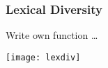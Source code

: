 
\begin{frame}[fragile]\frametitle{Lexical Diversity}

Write own function \ldots

\begin{center}
\texttt{[image: lexdiv]}
\end{center}
\end{frame}





